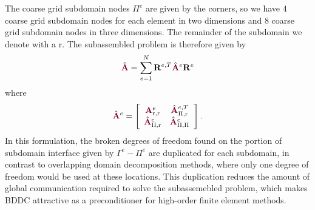 The coarse grid subdomain nodes $\Pi^e$ are given by the corners, so we have $4$ coarse grid subdomain nodes for each element in two dimensions and $8$ coarse grid subdomain nodes in three dimensions.
The remainder of the subdomain we denote with a $\text{r}$.
The subassembled problem is therefore given by
\begin{equation}
\hat{\color{burgundy}\mathbf{A}} = \sum_{e = 1}^N \mathbf{R}^{e, T} \hat{\color{burgundy}\mathbf{A}}^e \mathbf{R}^e
\label{eq:subassembled}
\end{equation}
where
\begin{equation}
\hat{\color{burgundy}\mathbf{A}}^e =
\left[ \begin{array}{c c}
{\color{burgundy}\mathbf{A}}_{\text{r}, \text{r}}^e  &  \hat{\color{burgundy}\mathbf{A}}_{\Pi, \text{r}}^{e, T}  \\
\hat{\color{burgundy}\mathbf{A}}_{\Pi, \text{r}}^e   &  \hat{\color{burgundy}\mathbf{A}}_{\Pi, \Pi}^e            \\
\end{array} \right].
\end{equation}
In this formulation, the broken degrees of freedom found on the portion of subdomain interface given by $\Gamma^e - \Pi^e$ are duplicated for each subdomain, in contrast to overlapping domain decomposition methods, where only one degree of freedom would be used at these locations.
This duplication reduces the amount of global communication required to solve the subassemebled problem, which makes BDDC attractive as a preconditioner for high-order finite element methods.

